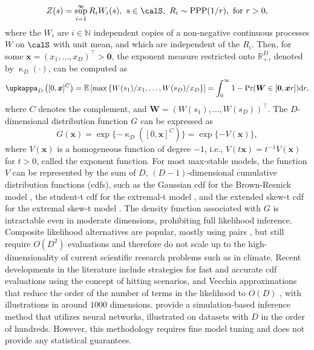 \documentclass[12pt]{article}
\begin{document}
\begin{equation}\label{eq:spectralrepresentation}
	Z(s) = \sup_{i=1}^\infty R_iW_i(s),\ s\in\calS, \ R_i \sim \text{PPP}(1/r),\ \text{for}\  r > 0,
\end{equation}
where the $W_i$ are $i\in\mathbb N$ independent copies of a non-negative continuous processes $W$ on $\calS$ with unit mean, and 
which are independent of the $R_i$.
Then, for some ${\bm x} = \left(x_1, \ldots, x_D \right)^\top > {\bm 0}$, the exponent measure restricted onto $\mathbb R^D_+$, denoted by $\upkappa_D(\cdot)$, can be computed as 
\begin{equation}\label{eq:exponentmeasure}
\upkappa_D\left([0,\bm x]^C\right)=\mathbb E\left[\max\left\{W(s_1)/x_1,\dots,W(s_D)/x_D \right\} \right] = \int_0^\infty 1 - \Pr(\bm W \in [\bm 0,\bm xr ])\text dr,	
\end{equation}
where $C$ denotes the complement, and $\bm W=(W(s_1),\dots,W(s_D))^\top$. The $D$-dimensional distribution function $G$ can be expressed as
\begin{equation}\label{eq:ppp}
G(\bm x) = \exp\{-\upkappa_D([0,\bm x]^C)\} = \exp\{-V(\bm x)\},
\end{equation}
where $V(\bm x)$ is a homogeneous function of degree $-1$, i.e., $V(t \bm x)=t^{-1}V(\bm x)$ for $t>0$, called the exponent function. 
%
For most max-stable models, the function $V$ can be represented by the sum of $D$, $(D-1)$-dimensional cumulative distribution functions (cdfs), such as the Gaussian cdf for the Brown-Resnick model \citep{Huser.Davison:2013a}, the student-t cdf for the extremal-t model \citep{Thibaud.Opitz:2015}, and the extended skew-t cdf for the extremal skew-t model \citep{Beranger.etal:2017}. The density function associated with $G$ is intractable even in moderate dimensions, prohibiting full likelihood inference. Composite likelihood alternatives are popular, mostly using pairs \citep{Padoan.etal:2010, Davison.etal:2012}, but still require $O(D^2)$ evaluations and therefore do not scale up to the high-dimensionality of current scientific research problems such as in climate. Recent developments in the literature include strategies for fast and accurate cdf evaluations \citep{Wadsworth.Tawn:2014,Beranger.etal:2021} using the concept of hitting scenarios, and Vecchia approximations that reduce the order of the number of terms in the likelihood to $O(D)$ \citep{Huser.Zhong:2023}, with illustrations in around $1000$ dimensions. \citet{Sainsbury.Zammit.Huser:2024} provide a simulation-based inference method that utilizes neural networks, illustrated on datasets with $D$ in the order of hundreds. However, this methodology requires fine model tuning and does not provide any statistical guarantees.     
\end{document}
